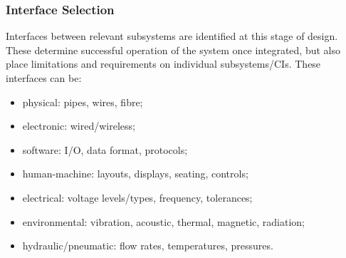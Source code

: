 \documentclass[journal]{IEEEtran}
\begin{document}
\subsubsection{Interface Selection}
Interfaces between relevant subsystems are identified at this stage of design. These determine successful operation of the system once integrated, but also place limitations and requirements on individual subsystems/CIs. These interfaces can be:
\begin{itemize}
	\item physical: pipes, wires, fibre;
	\item electronic: wired/wireless;
	\item software: I/O, data format, protocols;
	\item human-machine: layouts, displays, seating, controls;
	\item electrical: voltage levels/types, frequency, tolerances;
	\item environmental: vibration, acoustic, thermal, magnetic, radiation;
	\item hydraulic/pneumatic: flow rates, temperatures, pressures.
\end{itemize}
\end{document}
